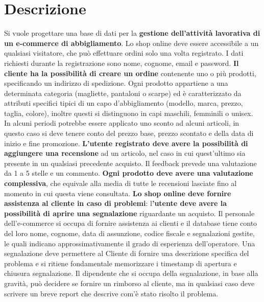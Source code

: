 \section{Descrizione}

Si vuole progettare una base di dati per la\textbf{ gestione dell'attività lavorativa di un e-commerce di abbigliamento}. Lo shop online deve essere accessibile a un qualsiasi visitatore, che può effettuare ordini solo una volta registrato. I dati richiesti durante la registrazione sono nome, cognome, email e password. \textbf{Il cliente ha la possibilità di creare un ordine} contenente uno o più prodotti, specificando un indirizzo di spedizione. Ogni prodotto appartiene a una determinata categoria (magliette, pantaloni o scarpe) ed è caratterizzato da attributi specifici tipici di un capo d'abbigliamento (modello, marca, prezzo, taglia, colore), inoltre questi si distinguono in capi maschili, femminili o unisex. In alcuni periodi potrebbe essere applicato uno sconto ad alcuni articoli, in questo caso si deve tenere conto del prezzo base, prezzo scontato e della data di inizio e fine promozione.
\textbf{L'utente registrato deve avere la possibilità di aggiungere una recensione} ad un articolo, nel caso in cui quest'ultimo sia presente in un qualsiasi precedente acquisto. Il feedback prevede una valutazione da 1 a 5 stelle e un commento. \textbf{Ogni prodotto deve avere una valutazione complessiva}, che equivale alla media di tutte le recensioni lasciate fino al momento in cui questa viene consultata.
\textbf{Lo shop online deve fornire assistenza al cliente in caso di problemi}: l\textbf{'utente deve avere la possibilità di aprire una segnalazione} riguardante un acquisto. Il personale dell'e-commerce si occupa di fornire assistenza ai clienti e il database tiene conto del loro nome, cognome, data di assunzione, codice fiscale e segnalazioni gestite, le quali indicano approssimativamente il grado di esperienza dell'operatore. Una segnalazione deve permettere al Cliente di fornire una descrizione specifica del problema e si ritiene fondamentale memorizzare i timestamp di apertura e chiusura segnalazione. Il dipendente che si occupa della segnalazione, in base alla gravità, può decidere se fornire un rimborso al cliente, ma in qualsiasi caso deve scrivere un breve report che descrive com'è stato risolto il problema.
\newpage